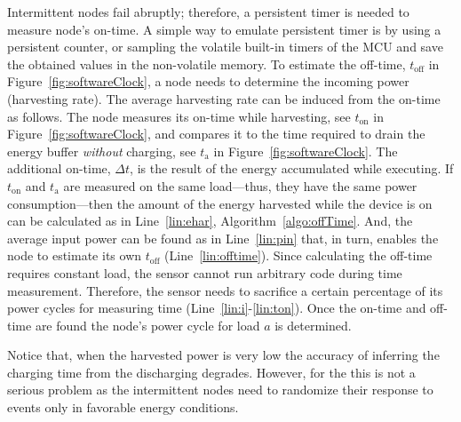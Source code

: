 Intermittent nodes fail abruptly; therefore, a persistent timer is needed to measure node's on-time. A simple way to emulate persistent timer is by using a persistent counter, or sampling the volatile built-in timers of the MCU and save the obtained values in the non-volatile memory. To estimate the off-time, $t_\text{off}$ in Figure~\ref{fig:softwareClock}, a node needs to determine the incoming power (harvesting rate). The average harvesting rate can be induced from the on-time as follows.
%
The node measures its on-time while harvesting, see $t_\text{on}$ in Figure~\ref{fig:softwareClock}, and compares it to the time required to drain the energy buffer \emph{without} charging, see $t_\text{a}$ in Figure~\ref{fig:softwareClock}. The additional on-time, $\Delta t$, is the result of the energy accumulated while executing. 
%
If $t_\text{on}$ and $t_\text{a}$ are measured on the same load---thus, they have the same power consumption---then the amount of the energy harvested while the device is on can be calculated as in Line~\ref{lin:ehar}, Algorithm~\ref{algo:offTime}. And, the average input power can be found as in Line~\ref{lin:pin} that, in turn, enables the node to estimate its own $t_\text{off}$ (Line~\ref{lin:offtime}).
Since calculating the off-time requires constant load, the sensor cannot run arbitrary code during time measurement. Therefore, the sensor needs to sacrifice a certain percentage of its power cycles for measuring time (Line~\ref{lin:i}-\ref{lin:ton}). Once the on-time and off-time are found the node's power cycle for load $a$ is determined.

Notice that, when the harvested power is very low the accuracy of inferring the charging time from the discharging degrades. However, for the \fullcis this is not a serious problem as the intermittent nodes need to randomize their response to events only in favorable energy conditions. 

